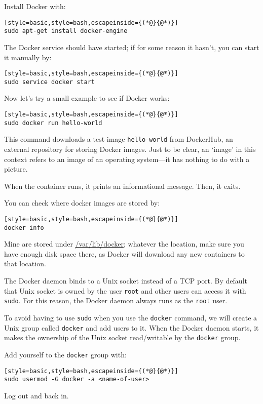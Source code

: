 Install Docker with:
\begin{lstlisting}[style=basic,style=bash,escapeinside={(*@}{@*)}]
sudo apt-get install docker-engine
\end{lstlisting}

The Docker service should have started; if for some reason it hasn't, you can start it manually by:
\begin{lstlisting}[style=basic,style=bash,escapeinside={(*@}{@*)}]
sudo service docker start
\end{lstlisting}

Now let's try a small example to see if Docker works:
\begin{lstlisting}[style=basic,style=bash,escapeinside={(*@}{@*)}]
sudo docker run hello-world
\end{lstlisting}

This command downloads a test image \texttt{hello-world} from DockerHub, an external repository for storing Docker images. Just to be clear, an `image' in this context refers to an image of an operating system---it has nothing to do with a picture.

When the container runs, it prints an informational message. Then, it exits.

You can check where docker images are stored by:
\begin{lstlisting}[style=basic,style=bash,escapeinside={(*@}{@*)}]
docker info
\end{lstlisting}
Mine are stored under \url{/var/lib/docker}; whatever the location, make sure you have enough disk space there, as Docker will download any new containers to that location.

The Docker daemon binds to a Unix socket instead of a TCP port. By default that Unix socket is owned by the user \texttt{root} and other users can access it with \texttt{sudo}. For this reason, the Docker daemon always runs as the \texttt{root} user.

To avoid having to use \texttt{sudo} when you use the \texttt{docker} command, we will create a Unix group called \texttt{docker} and add users to it. When the Docker daemon starts, it makes the ownership of the Unix socket read/writable by the \texttt{docker} group.

Add yourself to the \texttt{docker} group with:
\begin{lstlisting}[style=basic,style=bash,escapeinside={(*@}{@*)}]
sudo usermod -G docker -a <name-of-user>
\end{lstlisting}
Log out and back in.

